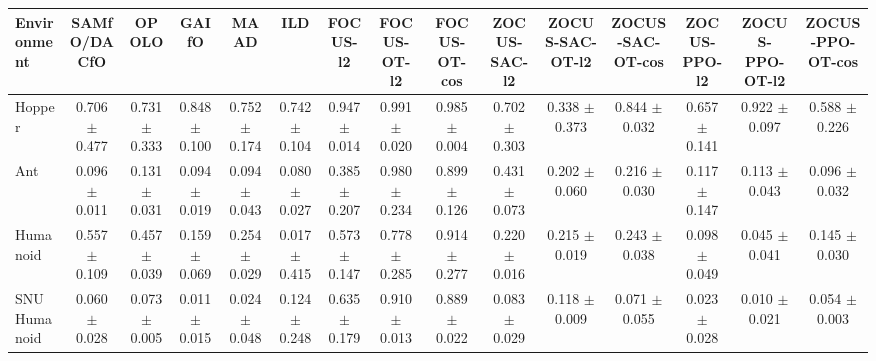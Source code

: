 \begin{tabular}{lcccccccccccccc}
\toprule
Environment & SAMfO/DACfO & OPOLO & GAIfO & MAAD & ILD & FOCUS-l2 & FOCUS-OT-l2 & FOCUS-OT-cos & ZOCUS-SAC-l2 & ZOCUS-SAC-OT-l2 & ZOCUS-SAC-OT-cos & ZOCUS-PPO-l2 & ZOCUS-PPO-OT-l2 & ZOCUS-PPO-OT-cos \\
\midrule
Hopper & 0.706 $\pm$ 0.477 & 0.731 $\pm$ 0.333 & 0.848 $\pm$ 0.100 & 0.752 $\pm$ 0.174 & 0.742 $\pm$ 0.104 & 0.947 $\pm$ 0.014 & 0.991 $\pm$ 0.020 & 0.985 $\pm$ 0.004 & 0.702 $\pm$ 0.303 & 0.338 $\pm$ 0.373 & 0.844 $\pm$ 0.032 & 0.657 $\pm$ 0.141 & 0.922 $\pm$ 0.097 & 0.588 $\pm$ 0.226 \\
Ant & 0.096 $\pm$ 0.011 & 0.131 $\pm$ 0.031 & 0.094 $\pm$ 0.019 & 0.094 $\pm$ 0.043 & 0.080 $\pm$ 0.027 & 0.385 $\pm$ 0.207 & 0.980 $\pm$ 0.234 & 0.899 $\pm$ 0.126 & 0.431 $\pm$ 0.073 & 0.202 $\pm$ 0.060 & 0.216 $\pm$ 0.030 & 0.117 $\pm$ 0.147 & 0.113 $\pm$ 0.043 & 0.096 $\pm$ 0.032 \\
Humanoid & 0.557 $\pm$ 0.109 & 0.457 $\pm$ 0.039 & 0.159 $\pm$ 0.069 & 0.254 $\pm$ 0.029 & 0.017 $\pm$ 0.415 & 0.573 $\pm$ 0.147 & 0.778 $\pm$ 0.285 & 0.914 $\pm$ 0.277 & 0.220 $\pm$ 0.016 & 0.215 $\pm$ 0.019 & 0.243 $\pm$ 0.038 & 0.098 $\pm$ 0.049 & 0.045 $\pm$ 0.041 & 0.145 $\pm$ 0.030 \\
SNU Humanoid & 0.060 $\pm$ 0.028 & 0.073 $\pm$ 0.005 & 0.011 $\pm$ 0.015 & 0.024 $\pm$ 0.048 & 0.124 $\pm$ 0.248 & 0.635 $\pm$ 0.179 & 0.910 $\pm$ 0.013 & 0.889 $\pm$ 0.022 & 0.083 $\pm$ 0.029 & 0.118 $\pm$ 0.009 & 0.071 $\pm$ 0.055 & 0.023 $\pm$ 0.028 & 0.010 $\pm$ 0.021 & 0.054 $\pm$ 0.003 \\
\bottomrule
\end{tabular}
